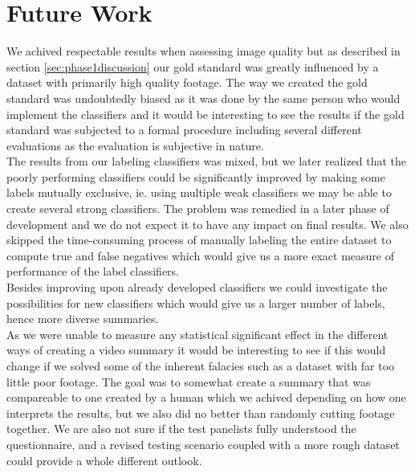 \section{Future Work}\label{sec:futurework}
%
% 
%
%
%
We achived respectable results when assessing image quality but as described in section \ref{sec:phase1discussion} our gold standard was greatly influenced by a dataset with primarily high quality footage. The way we created the gold standard was undoubtedly biased as it was done by the same person who would implement the classifiers and it would be interesting to see the results if the gold standard was subjected to a formal procedure including several different evaluations as the evaluation is subjective in nature.
\\
%
The results from our labeling classifiers was mixed, but we later realized that the poorly performing classifiers could be significantly improved by making some labels mutually exclusive, ie. using multiple weak classifiers we may be able to create several strong classifiers. The problem was remedied in a later phase of development and we do not expect it to have any impact on final results. We also skipped the time-consuming process of manually labeling the entire dataset to compute true and false negatives which would give us a more exact measure of performance of the label classifiers.\\
Besides improving upon already developed classifiers we could investigate the possibilities for new classifiers which would give us a larger number of labels, hence more diverse summaries. %
\\
%
As we were unable to measure any statistical significant effect in the different ways of creating a video summary it would be interesting to see if this would change if we solved some of the inherent falacies such as a dataset with far too little poor footage. The goal was to somewhat create a summary that was compareable to one created by a human which we achived depending on how one interprets the results, but we also did no better than randomly cutting footage together. We are also not sure if the test panelists fully understood the questionnaire, and a revised testing scenario coupled with a more rough dataset could provide a whole different outlook. %
